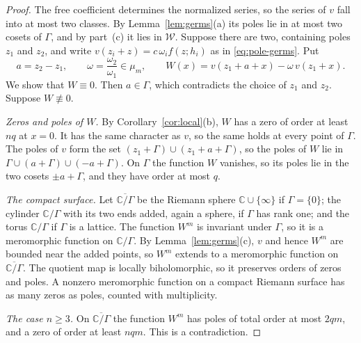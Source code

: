 \documentclass[11pt]{article}
\theoremstyle{definition}
\theoremstyle{remark}
\numberwithin{equation}{section}
\newcommand{\CC}{\mathbb C}
\newcommand{\Wclass}{\mathcal W}
\newcommand{\cyl}{\overline{\CC/\Gamma}}
\begin{document}
\begin{proof}
The free coefficient determines the normalized series, so the series of
\(v\) fall into at most two classes. By Lemma~\ref{lem:germs}(a) its
poles lie in at most two cosets of \(\Gamma\), and by part~(c) it lies
in \(\Wclass\).
Suppose there are two, containing poles \(z_1\) and \(z_2\), and write
\(v(z_i+z)=c\,\omega_if(z;h_i)\) as in \eqref{eq:pole-germs}. Put
\[
 a=z_2-z_1,\qquad \omega=\frac{\omega_2}{\omega_1}\in\mu_m,\qquad
 W(x)=v(z_1+a+x)-\omega\,v(z_1+x).
\]
We show that \(W\equiv0\). Then \(a\in\Gamma\), which contradicts the
choice of \(z_1\) and \(z_2\). Suppose \(W\not\equiv0\).

\emph{Zeros and poles of \(W\).} By Corollary~\ref{cor:local}(b), \(W\)
has a zero of order at least \(nq\) at \(x=0\). It has the same
character as \(v\), so the same holds at every point of \(\Gamma\). The
poles of \(v\) form the set \((z_1+\Gamma)\cup(z_1+a+\Gamma)\), so the
poles of \(W\) lie in \(\Gamma\cup(a+\Gamma)\cup(-a+\Gamma)\). On
\(\Gamma\) the function \(W\) vanishes, so its poles lie in the two
cosets \(\pm a+\Gamma\), and they have order at most \(q\).

\emph{The compact surface.} Let \(\cyl\) be the Riemann sphere
\(\CC\cup\{\infty\}\) if \(\Gamma=\{0\}\); the cylinder \(\CC/\Gamma\)
with its two ends added, again a sphere, if \(\Gamma\) has rank one;
and the torus \(\CC/\Gamma\) if \(\Gamma\) is a lattice. The function
\(W^m\) is invariant under \(\Gamma\), so it is a meromorphic function
on \(\CC/\Gamma\). By Lemma~\ref{lem:germs}(c), \(v\) and hence \(W^m\)
are bounded near the added points, so \(W^m\) extends to a meromorphic
function on \(\cyl\). The quotient map is locally biholomorphic, so it
preserves orders of zeros and poles. A nonzero meromorphic function on
a compact Riemann surface has as many zeros as poles, counted with
multiplicity.

\emph{The case \(n\ge3\).} On \(\cyl\) the function \(W^m\) has poles of
total order at most \(2qm\), and a zero of order at least \(nqm\). This
is a contradiction.


\end{proof}
\end{document}
